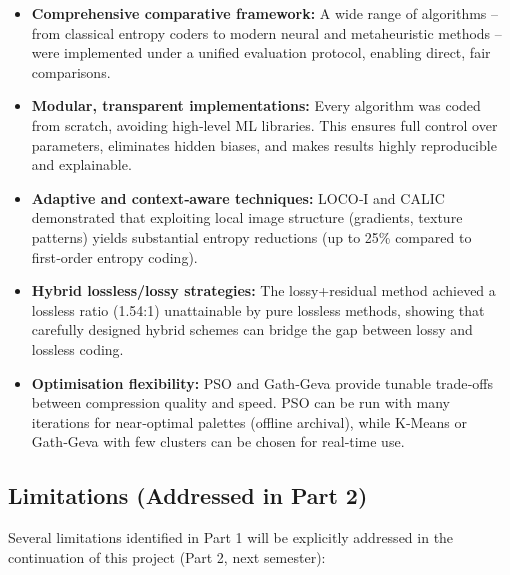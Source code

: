 \begin{itemize}
    \item \textbf{Comprehensive comparative framework:} A wide range of algorithms – from classical entropy coders to modern neural and metaheuristic methods – were implemented under a unified evaluation protocol, enabling direct, fair comparisons.
    \item \textbf{Modular, transparent implementations:} Every algorithm was coded from scratch, avoiding high‑level ML libraries. This ensures full control over parameters, eliminates hidden biases, and makes results highly reproducible and explainable.
    \item \textbf{Adaptive and context‑aware techniques:} LOCO‑I and CALIC demonstrated that exploiting local image structure (gradients, texture patterns) yields substantial entropy reductions (up to 25\% compared to first‑order entropy coding).
    \item \textbf{Hybrid lossless/lossy strategies:} The lossy+residual method achieved a lossless ratio (1.54:1) unattainable by pure lossless methods, showing that carefully designed hybrid schemes can bridge the gap between lossy and lossless coding.
    \item \textbf{Optimisation flexibility:} PSO and Gath‑Geva provide tunable trade‑offs between compression quality and speed. PSO can be run with many iterations for near‑optimal palettes (offline archival), while K‑Means or Gath‑Geva with few clusters can be chosen for real‑time use.
\end{itemize}

\subsection{Limitations (Addressed in Part 2)}

Several limitations identified in Part 1 will be explicitly addressed in the continuation of this project (Part 2, next semester):


